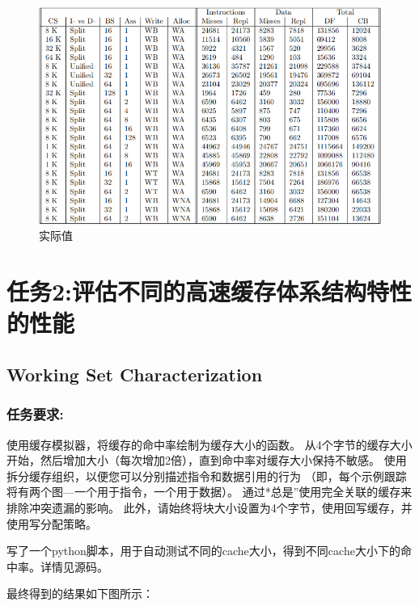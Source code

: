 \documentclass[12pt,hyperref,a4paper,UTF8]{ctexart}
\begin{document}
\begin{figure}[H]
    \centering
    \includegraphics[width=1\textwidth]{./figures/fig/image12.png}
    \caption{实际值}
\end{figure}





\section{任务2:评估不同的高速缓存体系结构特性的性能}

\subsection*{Working Set Characterization}

\subsubsection*{任务要求:}
使用缓存模拟器，将缓存的命中率绘制为缓存大小的函数。
从4个字节的缓存大小开始，然后增加大小（每次增加2倍），直到命中率对缓存大小保持不敏感。
使用拆分缓存组织，以便您可以分别描述指令和数据引用的行为
（即，每个示例跟踪将有两个图—一个用于指令，一个用于数据）。
通过*总是”使用完全关联的缓存来排除冲突遗漏的影响。
此外，请始终将块大小设置为4个字节，使用回写缓存，并使用写分配策略。

写了一个python脚本，用于自动测试不同的cache大小，得到不同cache大小下的命中率。详情见源码。

最终得到的结果如下图所示：
\end{document}
